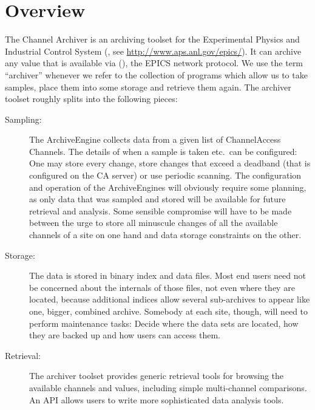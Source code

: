 \chapter{Overview}
The Channel Archiver is an archiving toolset for the Experimental Physics
and Industrial Control System
(, see
 \href{http://www.aps.anl.gov/epics/}{http://www.aps.anl.gov/epics/}).
It can archive any value that is available via 
(), the EPICS network protocol. We use the term ``archiver''
whenever we refer to the collection of programs which allow us to take samples,
place them into some storage and retrieve them again. The archiver
toolset roughly splits into the following pieces:

\begin{description}
\item[\sffamily Sampling:]
The ArchiveEngine collects data from a given list of ChannelAccess
Channels.  The details of when a sample is taken etc.\ can be
configured: One may store every change, store changes that exceed a
deadband (that is configured on the CA server) or use periodic
scanning.
The configuration and operation of the ArchiveEngines will obviously
require some planning, as only data that was sampled and stored will
be available for future retrieval and analysis. Some sensible
compromise will have to be made between the urge to store all
minuscule changes of all the available channels of a site on one hand
and data storage constraints on the other.

\item[\sffamily Storage:]
The data is stored in binary index and data files. Most end users need not
be concerned about the internals of those files, not even where they
are located, because additional indices allow several sub-archives to
appear like one, bigger, combined archive.
Somebody at each site, though, will need to perform maintenance
tasks: Decide where the data sets are located, how they are
backed up and how users can access them. 

\item[\sffamily Retrieval:]
The archiver toolset provides generic retrieval tools for browsing the
available channels and values, including simple multi-channel
comparisons.
An API allows users to write more sophisticated data analysis tools.
\end{description}

